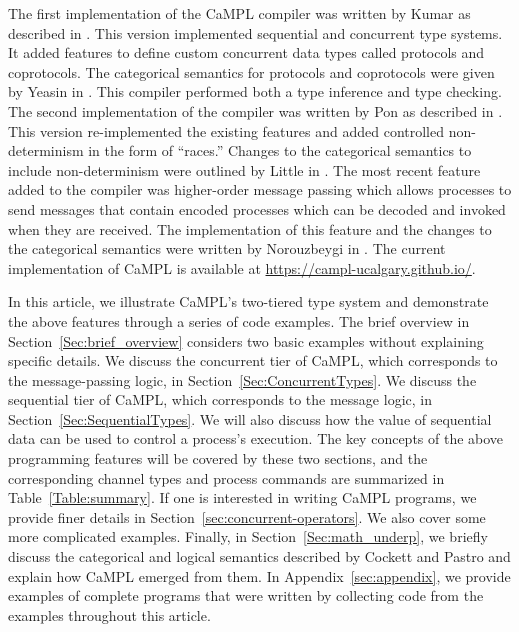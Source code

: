 \documentclass[11pt]{article}
\begin{document}
The first implementation of the CaMPL compiler was written by Kumar as described in \cite{Ku18}.
This version implemented sequential and concurrent type systems.
It added features to define custom concurrent data types called protocols and coprotocols.
The categorical semantics for protocols and coprotocols were given by Yeasin in \cite{Ye12}.
This compiler performed both a type inference and type checking.
The second implementation of the compiler was written by Pon as described in \cite{Po21, Po22}.
This version re-implemented the existing features and added controlled non-determinism in the form of ``races.''
Changes to the categorical semantics to include non-determinism were outlined by Little in \cite{xanna, xanna2}.
The most recent feature added to the compiler was higher-order message passing which allows processes to send messages that contain encoded processes which can be decoded and invoked when they are received.
The implementation of this feature and the changes to the categorical semantics were written by Norouzbeygi in \cite{No25, Cockett_2026}. 
The current implementation of CaMPL is available at \url{https://campl-ucalgary.github.io/}.

In this article, we illustrate CaMPL's two-tiered type system and demonstrate the above features through a series of code examples.
The brief overview in Section~\ref{Sec:brief_overview} considers two basic examples without explaining specific details.
We discuss the concurrent tier of CaMPL, which corresponds to the message-passing logic, in Section~\ref{Sec:ConcurrentTypes}.
We discuss the sequential tier of CaMPL, which corresponds to the message logic, in Section~\ref{Sec:SequentialTypes}.
We will also discuss how the value of sequential data can be used to control a process's execution.
The key concepts of the above programming features will be covered by these two sections, and the corresponding channel types and process commands are summarized in Table~\ref{Table:summary}.
If one is interested in writing CaMPL programs, we provide finer details in Section~\ref{sec:concurrent-operators}.
We also cover some more complicated examples.
Finally, in Section~\ref{Sec:math_underp}, we briefly discuss  the categorical and logical semantics described by Cockett and Pastro and explain how CaMPL emerged from them.
In Appendix~\ref{sec:appendix}, we provide examples of complete programs that were written by collecting code from the examples throughout this article.
\end{document}
